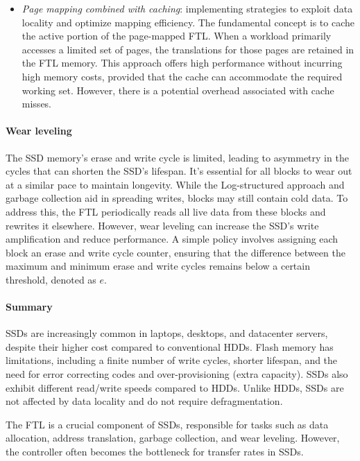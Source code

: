 \begin{itemize}
\begin{itemize}
            \item \textit{Page mapping combined with caching}: implementing strategies to exploit data locality and optimize mapping efficiency.
                The fundamental concept is to cache the active portion of the page-mapped FTL. 
                When a workload primarily accesses a limited set of pages, the translations for those pages are retained in the FTL memory. 
                This approach offers high performance without incurring high memory costs, provided that the cache can accommodate the required working set. 
                However, there is a potential overhead associated with cache misses.
        \end{itemize}
\end{itemize}

\paragraph*{Wear leveling}
The SSD memory's erase and write cycle is limited, leading to asymmetry in the cycles that can shorten the SSD's lifespan. 
It's essential for all blocks to wear out at a similar pace to maintain longevity.
While the Log-structured approach and garbage collection aid in spreading writes, blocks may still contain cold data. 
To address this, the FTL periodically reads all live data from these blocks and rewrites it elsewhere. 
However, wear leveling can increase the SSD's write amplification and reduce performance. 
A simple policy involves assigning each block an erase and write cycle counter, ensuring that the difference between the maximum and minimum erase and write cycles remains below a certain threshold, denoted as $e$.

\paragraph*{Summary}
SSDs are increasingly common in laptops, desktops, and datacenter servers, despite their higher cost compared to conventional HDDs. 
Flash memory has limitations, including a finite number of write cycles, shorter lifespan, and the need for error correcting codes and over-provisioning (extra capacity). 
SSDs also exhibit different read/write speeds compared to HDDs. 
Unlike HDDs, SSDs are not affected by data locality and do not require defragmentation.

The FTL is a crucial component of SSDs, responsible for tasks such as data allocation, address translation, garbage collection, and wear leveling. 
However, the controller often becomes the bottleneck for transfer rates in SSDs.

